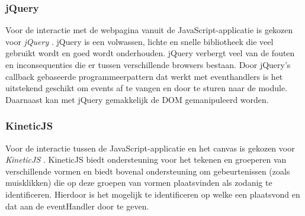 \subsubsection{jQuery}
Voor de interactie met de webpagina vanuit de JavaScript-applicatie is gekozen voor \emph{jQuery} \cite{jQuery}. jQuery is een volwassen, lichte en snelle bibliotheek die veel gebruikt wordt en goed wordt onderhouden. jQuery verbergt veel van de fouten en inconsequenties die er tussen verschillende browsers bestaan. Door jQuery's callback gebaseerde programmeerpattern dat werkt met eventhandlers is het uitstekend geschikt om events af te vangen en door te sturen naar de module. Daarnaast kan met jQuery gemakkelijk de DOM gemanipuleerd worden.

\subsubsection{KineticJS}
Voor de interactie tussen de JavaScript-applicatie en het canvas is gekozen voor \emph{KineticJS} \cite{KineticJS}. KineticJS biedt ondersteuning voor het tekenen en groeperen van verschillende vormen en biedt bovenal ondersteuning om gebeurtenissen (zoals muisklikken) die op deze groepen van vormen plaatsvinden als zodanig te identificeren. Hierdoor is het mogelijk te identificeren op welke  een  plaatsvond en dat aan de eventHandler door te geven.
